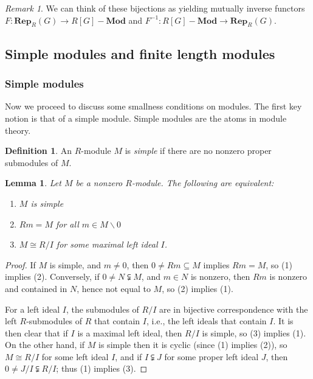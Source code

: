 \documentclass{amsart}[12pt]
\newcommand{\DEF}[1]{\emph{#1}\index{#1}}
\numberwithin{equation}{section}
\theoremstyle{plain} %
\newtheorem{lem}[equation]{Lemma}
\theoremstyle{definition}
\newtheorem{defn}[equation]{Definition}
\theoremstyle{remark}
\newtheorem{rem}[equation]{Remark}
\newcommand{\ssec}[1]{\subsection{#1}}
\newcommand{\sssec}[1]{\subsubsection{#1}}
\newcommand{\Mod}[1]{#1-\mathbf{Mod}}
\newcommand{\Rep}[2]{\mathbf{Rep}_{#1}(#2)}
\begin{document}
\begin{rem}
We can think of these bijections as yielding mutually inverse functors $F:\Rep{R}{G} \to \Mod{R[G]}$ and $F^{-1}:\Mod{R[G]} \to \Rep{R}{G}$.
\end{rem}

\ssec{Simple modules and finite length modules}

\sssec{Simple modules}

Now we proceed to discuss some smallness conditions on modules. The first key notion is that of a simple module. Simple modules are the atoms in module theory.

\begin{defn} An $R$-module $M$ is \DEF{simple} if there are no nonzero proper submodules of $M$.
\end{defn}

\begin{lem} Let $M$ be a nonzero $R$-module. The following are equivalent:
\begin{enumerate}
\item $M$ is simple
\item $Rm= M$ for all $m\in M\smallsetminus 0$
\item $M\cong R/I$ for some maximal left ideal $I$.
\end{enumerate}
\end{lem}
\begin{proof}
If $M$ is simple, and $m\neq 0$, then $0\neq Rm \subseteq M$ implies $Rm=M$, so (1) implies (2). Conversely, if  $0 \neq N\subsetneqq M$, and $m\in N$ is nonzero, then $Rm$ is nonzero and contained in $N$, hence not equal to $M$, so (2) implies (1).

For a left  ideal $I$, the submodules of $R/I$ are in bijective correspondence with the left $R$-submodules of $R$ that contain $I$, i.e., the left ideals that contain $I$. It is then clear that if $I$ is a maximal left ideal, then $R/I$ is simple, so (3) implies (1). 
On the other hand, if $M$ is simple then it is cyclic (since (1) implies (2)), so $M\cong R/I$ for some left ideal $I$, and if $I \subsetneqq J$ for some proper left ideal $J$, then $0 \neq J/I \subsetneqq R/I$; thus (1) implies (3).
\end{proof}
\end{document}
